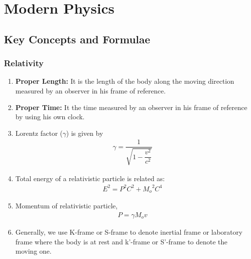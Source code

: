 \chapter{Modern Physics}

\pagestyle{fancy}
\fancyhf{}
\fancyhead[OC]{\leftmark}
\fancyhead[EC]{\rightmark}
\cfoot{\thepage}

\section{Key Concepts and Formulae}
\subsection{Relativity}
\begin{enumerate}
\item \textbf{Proper Length:} It is the length of the body along the moving direction measured by an observer in his frame of reference.
\item \textbf{Proper Time:} It the time measured by an observer in his frame of reference by using his own clock.
\item Lorentz factor ($\gamma$) is given by
\begin{align}
    {\gamma} = \dfrac{1}{\sqrt{1-\dfrac{v^2}{c^2}}}     \label{eq1}
\end{align}
\item Total energy of a relativistic particle is related as:
\begin{align}
E^2  =  P^2C^2  +  {M_o}^2C^4      \label{eq2}
\end{align}
\item Momentum of relativistic particle,
\begin{align}
P = {\gamma}{M_o}v      \label{eq3}
\end{align}
\item Generally, we use K-frame or S-frame to denote inertial frame or laboratory frame where the body is at rest and k'-frame or S'-frame to denote the moving one.
\end{enumerate}
